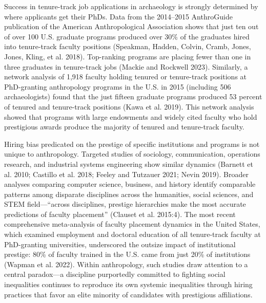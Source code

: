 \documentclass[
  12pt,
]{article}
\begin{document}
Success in tenure-track job applications in archaeology is strongly
determined by where applicants get their PhDs. Data from the 2014--2015
AnthroGuide publication of the American Anthropological Association
shows that just ten out of over 100 U.S. graduate programs produced over
30\% of the graduates hired into tenure-track faculty positions
(Speakman, Hadden, Colvin, Cramb, Jones, Jones, Kling, et al. 2018).
Top-ranking programs are placing fewer than one in three graduates in
tenure-track jobs (Mackie and Rockwell 2023). Similarly, a network
analysis of 1,918 faculty holding tenured or tenure-track positions at
PhD-granting anthropology programs in the U.S. in 2015 (including 506
archaeologists) found that the just fifteen graduate programs produced
53 percent of tenured and tenure-track positions (Kawa et al. 2019).
This network analysis showed that programs with large endowments and
widely cited faculty who hold prestigious awards produce the majority of
tenured and tenure-track faculty.

Hiring bias predicated on the prestige of specific institutions and
programs is not unique to anthropology. Targeted studies of sociology,
communication, operations research, and industrial systems engineering
show similar dynamics (Barnett et al. 2010; Castillo et al. 2018; Feeley
and Tutzauer 2021; Nevin 2019). Broader analyses comparing computer
science, business, and history identify comparable patterns among
disparate disciplines across the humanities, social sciences, and STEM
field---``across disciplines, prestige hierarchies make the most
accurate predictions of faculty placement'' (Clauset et al. 2015:4). The
most recent comprehensive meta-analysis of faculty placement dynamics in
the United States, which examined employment and doctoral education of
all tenure-track faculty at PhD-granting universities, underscored the
outsize impact of institutional prestige: 80\% of faculty trained in the
U.S. came from just 20\% of institutions (Wapman et al. 2022). Within
anthropology, such studies draw attention to a central paradox---a
discipline purportedly committed to fighting social inequalities
continues to reproduce its own systemic inequalities through hiring
practices that favor an elite minority of candidates with prestigious
affiliations.
\end{document}
